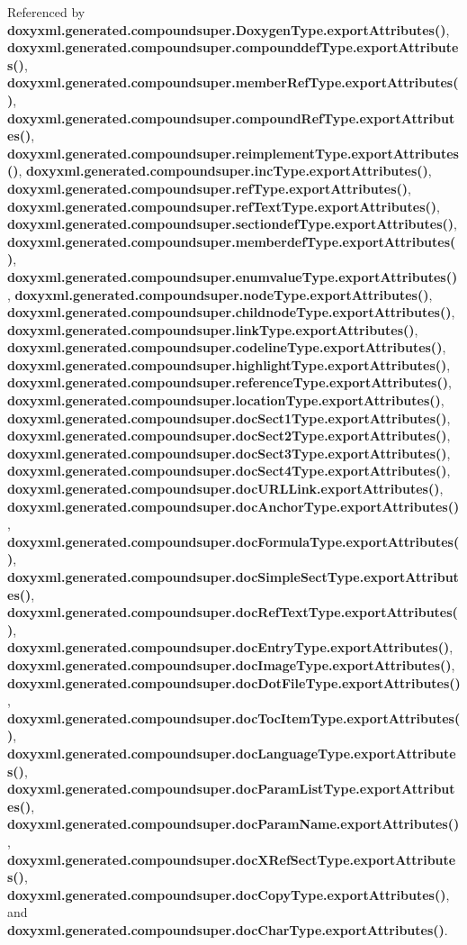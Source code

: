 Referenced by {\bf doxyxml.\+generated.\+compoundsuper.\+Doxygen\+Type.\+export\+Attributes()}, {\bf doxyxml.\+generated.\+compoundsuper.\+compounddef\+Type.\+export\+Attributes()}, {\bf doxyxml.\+generated.\+compoundsuper.\+member\+Ref\+Type.\+export\+Attributes()}, {\bf doxyxml.\+generated.\+compoundsuper.\+compound\+Ref\+Type.\+export\+Attributes()}, {\bf doxyxml.\+generated.\+compoundsuper.\+reimplement\+Type.\+export\+Attributes()}, {\bf doxyxml.\+generated.\+compoundsuper.\+inc\+Type.\+export\+Attributes()}, {\bf doxyxml.\+generated.\+compoundsuper.\+ref\+Type.\+export\+Attributes()}, {\bf doxyxml.\+generated.\+compoundsuper.\+ref\+Text\+Type.\+export\+Attributes()}, {\bf doxyxml.\+generated.\+compoundsuper.\+sectiondef\+Type.\+export\+Attributes()}, {\bf doxyxml.\+generated.\+compoundsuper.\+memberdef\+Type.\+export\+Attributes()}, {\bf doxyxml.\+generated.\+compoundsuper.\+enumvalue\+Type.\+export\+Attributes()}, {\bf doxyxml.\+generated.\+compoundsuper.\+node\+Type.\+export\+Attributes()}, {\bf doxyxml.\+generated.\+compoundsuper.\+childnode\+Type.\+export\+Attributes()}, {\bf doxyxml.\+generated.\+compoundsuper.\+link\+Type.\+export\+Attributes()}, {\bf doxyxml.\+generated.\+compoundsuper.\+codeline\+Type.\+export\+Attributes()}, {\bf doxyxml.\+generated.\+compoundsuper.\+highlight\+Type.\+export\+Attributes()}, {\bf doxyxml.\+generated.\+compoundsuper.\+reference\+Type.\+export\+Attributes()}, {\bf doxyxml.\+generated.\+compoundsuper.\+location\+Type.\+export\+Attributes()}, {\bf doxyxml.\+generated.\+compoundsuper.\+doc\+Sect1\+Type.\+export\+Attributes()}, {\bf doxyxml.\+generated.\+compoundsuper.\+doc\+Sect2\+Type.\+export\+Attributes()}, {\bf doxyxml.\+generated.\+compoundsuper.\+doc\+Sect3\+Type.\+export\+Attributes()}, {\bf doxyxml.\+generated.\+compoundsuper.\+doc\+Sect4\+Type.\+export\+Attributes()}, {\bf doxyxml.\+generated.\+compoundsuper.\+doc\+U\+R\+L\+Link.\+export\+Attributes()}, {\bf doxyxml.\+generated.\+compoundsuper.\+doc\+Anchor\+Type.\+export\+Attributes()}, {\bf doxyxml.\+generated.\+compoundsuper.\+doc\+Formula\+Type.\+export\+Attributes()}, {\bf doxyxml.\+generated.\+compoundsuper.\+doc\+Simple\+Sect\+Type.\+export\+Attributes()}, {\bf doxyxml.\+generated.\+compoundsuper.\+doc\+Ref\+Text\+Type.\+export\+Attributes()}, {\bf doxyxml.\+generated.\+compoundsuper.\+doc\+Entry\+Type.\+export\+Attributes()}, {\bf doxyxml.\+generated.\+compoundsuper.\+doc\+Image\+Type.\+export\+Attributes()}, {\bf doxyxml.\+generated.\+compoundsuper.\+doc\+Dot\+File\+Type.\+export\+Attributes()}, {\bf doxyxml.\+generated.\+compoundsuper.\+doc\+Toc\+Item\+Type.\+export\+Attributes()}, {\bf doxyxml.\+generated.\+compoundsuper.\+doc\+Language\+Type.\+export\+Attributes()}, {\bf doxyxml.\+generated.\+compoundsuper.\+doc\+Param\+List\+Type.\+export\+Attributes()}, {\bf doxyxml.\+generated.\+compoundsuper.\+doc\+Param\+Name.\+export\+Attributes()}, {\bf doxyxml.\+generated.\+compoundsuper.\+doc\+X\+Ref\+Sect\+Type.\+export\+Attributes()}, {\bf doxyxml.\+generated.\+compoundsuper.\+doc\+Copy\+Type.\+export\+Attributes()}, and {\bf doxyxml.\+generated.\+compoundsuper.\+doc\+Char\+Type.\+export\+Attributes()}.



